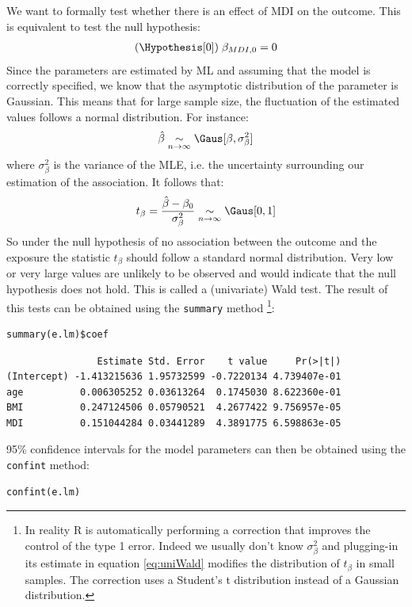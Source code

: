 \documentclass{article}
\begin{document}
We want to formally test whether there is an effect of MDI on the
outcome. This is equivalent to test the null hypothesis:
\begin{align*}
(\Hypothesis[0]) \; \beta_{MDI,0} = 0
\end{align*}
 Since the parameters are estimated by ML and assuming that the model
is correctly specified, we know that the asymptotic distribution of
the parameter is Gaussian. This means that for large sample size, the
fluctuation of the estimated values follows a normal distribution. For
instance:
\begin{align*}
\hat{\beta} \underset{n \rightarrow \infty}{\sim} \Gaus[\beta,\sigma^2_\beta]
\end{align*}
where \(\sigma^2_\beta\) is the variance of the MLE, i.e. the
uncertainty surrounding our estimation of the association. It follows that:
\begin{align}
t_{\beta} = \frac{\hat{\beta}-\beta_0}{\sigma^2_\beta} \underset{n \rightarrow \infty}{\sim} \Gaus[0,1] \label{eq:uniWald}
\end{align}
So under the null hypothesis of no association between the outcome and
the exposure the statistic \(t_{\beta}\) should follow a standard
normal distribution. Very low or very large values are unlikely to be
observed and would indicate that the null hypothesis does not
hold. This is called a (univariate) Wald test. The result of this
tests can be obtained using the \texttt{summary} method \footnote{In reality R is automatically performing a correction that
improves the control of the type 1 error. Indeed we usually don't know
\(\sigma^2_\beta\) and plugging-in its estimate in equation
\eqref{eq:uniWald} modifies the distribution of \(t_{\beta}\) in small
samples. The correction uses a Student's t distribution instead of a
Gaussian distribution.}:
\lstset{language=r,label= ,caption= ,captionpos=b,numbers=none}
\begin{lstlisting}
summary(e.lm)$coef
\end{lstlisting}

\begin{verbatim}
                Estimate Std. Error    t value     Pr(>|t|)
(Intercept) -1.413215636 1.95732599 -0.7220134 4.739407e-01
age          0.006305252 0.03613264  0.1745030 8.622360e-01
BMI          0.247124506 0.05790521  4.2677422 9.756957e-05
MDI          0.151044284 0.03441289  4.3891775 6.598863e-05
\end{verbatim}

95\% confidence intervals for the model parameters can then be obtained
using the \texttt{confint} method:
\lstset{language=r,label= ,caption= ,captionpos=b,numbers=none}
\begin{lstlisting}
confint(e.lm)
\end{lstlisting}
\end{document}
